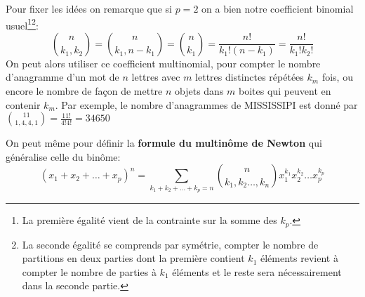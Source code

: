 Pour fixer les idées on remarque que si \(p = 2\) on a bien notre coefficient binomial usuel\footnote{
   La première égalité vient de la contrainte sur la somme des \(k_p\).
}\footnote{La seconde égalité se comprends par symétrie, compter le nombre de partitions en deux parties dont la première contient \(k_1\) éléments revient à compter le nombre de parties à \(k_1\) éléments et le reste sera nécessairement dans la seconde partie.}:
\[
   \binom{n}{k_1, k_2} =  \binom{n}{k_1, n - k_1} = \binom{n}{k_1} = \frac{n!}{k_1!(n-k_1)} = \frac{n!}{k_1!k_2!}
\]
On peut alors utiliser ce coefficient multinomial, pour compter le nombre d'anagramme d'un mot de \(n\) lettres avec \(m\) lettres distinctes répétées \(k_m\) fois, ou encore le nombre de façon de mettre \(n\) objets dans \(m\) boites qui peuvent en contenir \(k_m\).\+
Par exemple, le nombre d'anagrammes de MISSISSIPI est donné par \(\binom{11}{1 , 4, 4, 1}  = \frac{11!}{4!4!} = 34650\)\<

On peut même pour définir la \textbf{formule du multinôme de Newton} qui généralise celle du binôme:
\[
   (x_1 + x_2 + \ldots + x_p)^n = \sum_{k_1+k_2+\ldots+k_p = n} \binom{n}{k_1, k_2 \ldots, k_n} x_1^{k_1} x_2^{k_2} \ldots x_p^{k_p}
\]
